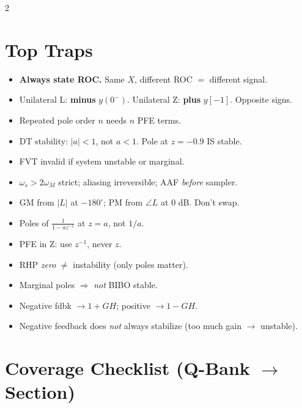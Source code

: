 \documentclass[12pt]{extarticle}
\begin{document}
\begin{multicols*}{2}
\section*{Top Traps}

\begin{itemize}
\item \textbf{Always state ROC.} Same $X$, different ROC $=$ different signal.
\item Unilateral L: \textbf{minus} $y(0^-)$. Unilateral Z: \textbf{plus} $y[-1]$. Opposite signs.
\item Repeated pole order $n$ needs $n$ PFE terms.
\item DT stability: $|a| < 1$, not $a < 1$. Pole at $z = -0.9$ IS stable.
\item FVT invalid if system unstable or marginal.
\item $\omega_s > 2\omega_M$ strict; aliasing irreversible; AAF \emph{before} sampler.
\item GM from $|L|$ at $-180^\circ$; PM from $\angle L$ at 0 dB. Don't swap.
\item Poles of $\tfrac{1}{1-az^{-1}}$ at $z = a$, not $1/a$.
\item PFE in Z: use $z^{-1}$, never $z$.
\item RHP \emph{zero} $\ne$ instability (only poles matter).
\item Marginal poles $\Rightarrow$ \emph{not} BIBO stable.
\item Negative fdbk $\to 1+GH$; positive $\to 1-GH$.
\item Negative feedback does \emph{not} always stabilize (too much gain $\to$ unstable).
\end{itemize}

\section*{Coverage Checklist (Q-Bank $\to$ Section)}


\end{multicols*}
\end{document}
